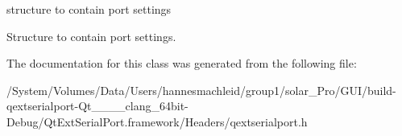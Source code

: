 structure to contain port settings

Structure to contain port settings.


\begin{DoxyCode}{0}
\end{DoxyCode}
 

The documentation for this class was generated from the following file\+:\begin{DoxyCompactItemize}
\item 
/\+System/\+Volumes/\+Data/\+Users/hannesmachleid/group1/solar\+\_\+\+Pro/\+G\+U\+I/build-\/qextserialport-\/\+Qt\+\_\+\_\+\_\+\_\+clang\+\_\+64bit-\/\+Debug/\+Qt\+Ext\+Serial\+Port.\+framework/\+Headers/qextserialport.\+h\end{DoxyCompactItemize}

